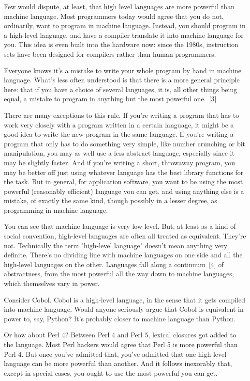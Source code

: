\documentclass[10pt,twoside,openright]{memoir}
\begin{document}
Few would dispute, at least, that high level languages are more powerful than machine language. Most programmers today would agree that you do not, ordinarily, want to program in machine language. Instead, you should program in a high-level language, and have a compiler translate it into machine language for you. This idea is even built into the hardware now: since the 1980s, instruction sets have been designed for compilers rather than human programmers.

Everyone knows it's a mistake to write your whole program by hand in machine language. What's less often understood is that there is a more general principle here: that if you have a choice of several languages, it is, all other things being equal, a mistake to program in anything but the most powerful one.~[3]

There are many exceptions to this rule. If you're writing a program that has to work very closely with a program written in a certain language, it might be a good idea to write the new program in the same language. If you're writing a program that only has to do something very simple, like number crunching or bit manipulation, you may as well use a less abstract language, especially since it may be slightly faster. And if you're writing a short, throwaway program, you may be better off just using whatever language has the best library functions for the task. But in general, for application software, you want to be using the most powerful (reasonably efficient) language you can get, and using anything else is a mistake, of exactly the same kind, though possibly in a lesser degree, as programming in machine language.

You can see that machine language is very low level. But, at least as a kind of social convention, high-level languages are often all treated as equivalent. They're not. Technically the term "high-level language" doesn't mean anything very definite. There's no dividing line with machine languages on one side and all the high-level languages on the other. Languages fall along a continuum~[4] of abstractness, from the most powerful all the way down to machine languages, which themselves vary in power.

Consider Cobol. Cobol is a high-level language, in the sense that it gets compiled into machine language. Would anyone seriously argue that Cobol is equivalent in power to, say, Python? It's probably closer to machine language than Python.

Or how about Perl 4? Between Perl 4 and Perl 5, lexical closures got added to the language. Most Perl hackers would agree that Perl 5 is more powerful than Perl 4. But once you've admitted that, you've admitted that one high level language can be more powerful than another. And it follows inexorably that, except in special cases, you ought to use the most powerful you can get.
\end{document}
